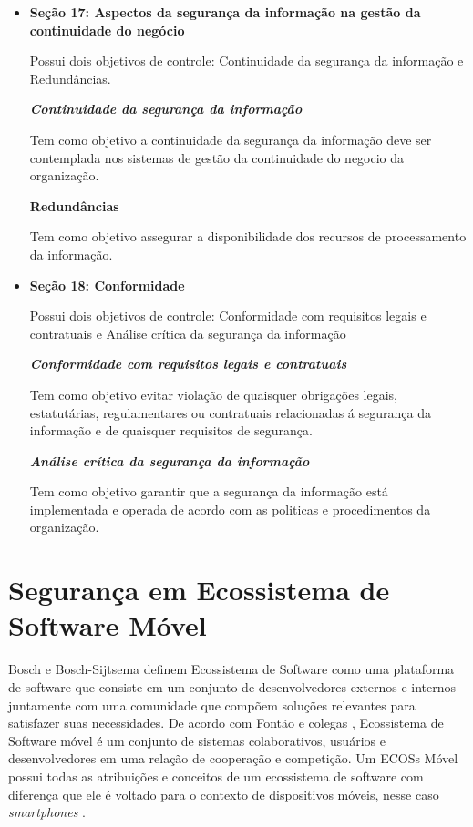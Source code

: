 \begin{itemize}
    \item \textbf{Seção 17: Aspectos da segurança da informação na gestão da continuidade do negócio}
    
    Possui dois objetivos de controle: Continuidade da segurança da informação e Redundâncias.
    
    \textit{\textbf{Continuidade da segurança da informação}}
    
    Tem como objetivo a continuidade da segurança da informação deve ser contemplada nos sistemas de gestão da continuidade do negocio da organização.
    
    \textbf{Redundâncias}
    
     Tem como objetivo assegurar a disponibilidade dos recursos de processamento da informação.
\end{itemize}
\begin{itemize}
    \item \textbf{Seção 18: Conformidade}
    
    Possui dois objetivos de controle: Conformidade com requisitos legais e contratuais e Análise crítica da segurança da informação
    
   \textit{ \textbf{Conformidade com requisitos legais e contratuais}}
    
    Tem como objetivo evitar violação de quaisquer obrigações legais, estatutárias, regulamentares ou contratuais relacionadas á segurança da informação e de quaisquer requisitos de segurança.
    
    \textit{\textbf{Análise crítica da segurança da informação}}
    
    Tem como objetivo garantir que a segurança da informação está implementada e operada de acordo com as politicas e procedimentos da organização.
\end{itemize}


\section{Segurança em Ecossistema de Software Móvel}

Bosch e Bosch-Sijtsema \cite{bosch2010integration} definem Ecossistema de Software como uma plataforma de software que consiste em um conjunto de desenvolvedores externos e internos juntamente com uma comunidade que compõem soluções  relevantes para satisfazer suas necessidades. De acordo com Fontão e colegas \cite{fontao}, Ecossistema de Software móvel é um conjunto de sistemas colaborativos, usuários e desenvolvedores em uma relação de cooperação e competição. Um ECOSs Móvel possui todas as atribuições e conceitos de um ecossistema de software com diferença que ele é voltado para o contexto de dispositivos móveis, nesse caso \textit{smartphones} \cite{mestradoCaio}.

